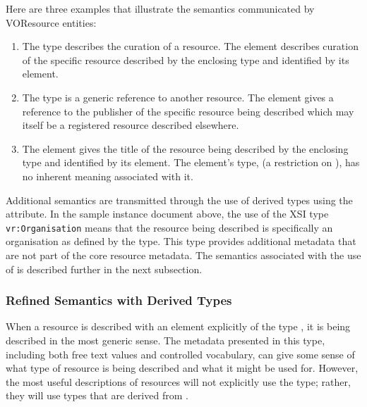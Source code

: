 \documentclass[11pt,a4paper]{ivoa}
\begin{document}
Here are three examples that illustrate the semantics communicated by
VOResource entities:

\begin{enumerate}
\item The  type describes the curation of a
       resource.  The  element
       describes curation of the specific resource described by the
       enclosing  type and identified by its
        element.

  \item The  type is a generic reference to
       another resource.  The  element
       gives a reference to the publisher of the specific resource being
       described which may itself be a registered resource described
       elsewhere.

  \item The  element gives the title of
       the resource being described by the enclosing
        type and identified by its
        element.  The
        element's type,
        (a restriction on
       ), has no inherent meaning associated
       with it.
\end{enumerate}


Additional semantics are transmitted through the use of derived types
using the  attribute.  In the sample instance document
above, the use of the XSI type \verb|vr:Organisation| means that the
resource being described is specifically an organisation as defined by
the  type.  This type provides additional
metadata that are not part of the core resource metadata.  The semantics
associated with the use of  is described further in the
next subsection.



\subsubsection{Refined Semantics with Derived Types}
\label{sect:derivedtypes}

When a resource is described with an element explicitly of the type
, it is being described in the most generic
sense.  The metadata presented in this type, including both free text
values and controlled vocabulary, can give some sense of what
type of resource is being described and what it might be used for.
However, the most useful descriptions of resources will not explicitly
use the  type; rather, they will use types
that are derived from .
\end{document}
